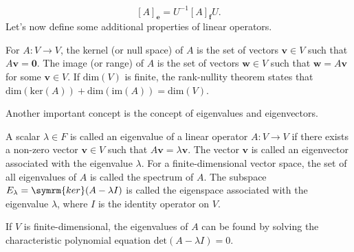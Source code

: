 \begin{equation}\label{eq:change_of_basis}
[A]_{\symbf{e}}=U^{-1}[A]_{\symbf{f}}U.
\end{equation}
Let's now define some additional properties of linear operators.
\begin{definition}
For $A:V\to V$, the kernel (or null space) of $A$ is the set of vectors $\symbf{v}\in V$ such that $A\symbf{v}=\symbf{0}$. The image (or range) of $A$ is the set of vectors $\symbf{w}\in V$ such that $\symbf{w}=A\symbf{v}$ for some $\symbf{v}\in V$. If $\text{dim}(V)$ is finite, the rank-nullity theorem states that $\text{dim}(\text{ker}(A))+\text{dim}(\text{im}(A))=\text{dim}(V)$.
\end{definition}
Another important concept is the concept of eigenvalues and eigenvectors.
\begin{definition}
A scalar $\lambda\in F$ is called an eigenvalue of a linear operator $A:V\to V$ if there exists a non-zero vector $\symbf{v}\in V$ such that $A\symbf{v}=\lambda\symbf{v}$. The vector $\symbf{v}$ is called an eigenvector associated with the eigenvalue $\lambda$. For a finite-dimensional vector space, the set of all eigenvalues of $A$ is called the spectrum of $A$. The subspace $E_\lambda=\symrm{ker}(A-\lambda I)$ is called the eigenspace associated with the eigenvalue $\lambda$, where $I$ is the identity operator on $V$.
\end{definition}
If $V$ is finite-dimensional, the eigenvalues of $A$ can be found by solving the characteristic polynomial equation $\text{det}(A-\lambda I)=0$.
